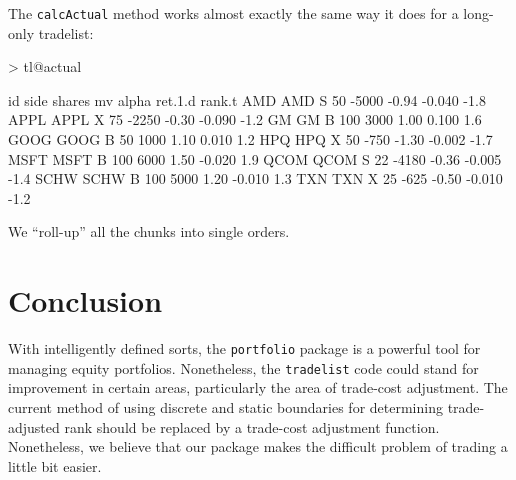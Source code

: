 \documentclass{article}
\begin{document}
The \texttt{calcActual} method works almost exactly the same way it
does for a long-only tradelist: 

\begin{Schunk}
\begin{Sinput}
> tl@actual
\end{Sinput}
\begin{Soutput}
       id side shares    mv alpha ret.1.d rank.t
AMD   AMD    S     50 -5000 -0.94  -0.040   -1.8
APPL APPL    X     75 -2250 -0.30  -0.090   -1.2
GM     GM    B    100  3000  1.00   0.100    1.6
GOOG GOOG    B     50  1000  1.10   0.010    1.2
HPQ   HPQ    X     50  -750 -1.30  -0.002   -1.7
MSFT MSFT    B    100  6000  1.50  -0.020    1.9
QCOM QCOM    S     22 -4180 -0.36  -0.005   -1.4
SCHW SCHW    B    100  5000  1.20  -0.010    1.3
TXN   TXN    X     25  -625 -0.50  -0.010   -1.2
\end{Soutput}
\end{Schunk}

We ``roll-up'' all the chunks into single orders.

\section{Conclusion}

With intelligently defined sorts, the \texttt{portfolio} package is a
powerful tool for managing equity portfolios.  Nonetheless, the
\texttt{tradelist} code could stand for improvement in certain areas,
particularly the area of trade-cost adjustment.  The current method of
using discrete and static boundaries for determining trade-adjusted
rank should be replaced by a trade-cost adjustment function.
Nonetheless, we believe that our package makes the difficult problem
of trading a little bit easier.
\end{document}
